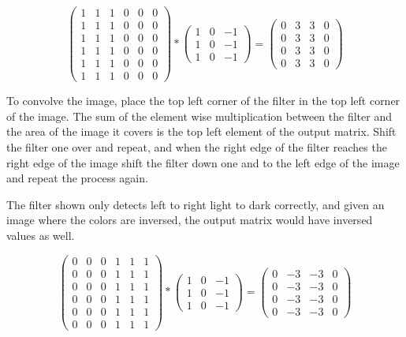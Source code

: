 \documentclass[12pt]{article}
\begin{document}
\[
    \begin{pmatrix}
        1 & 1 & 1 & 0 & 0 & 0\\
        1 & 1 & 1 & 0 & 0 & 0\\
        1 & 1 & 1 & 0 & 0 & 0\\
        1 & 1 & 1 & 0 & 0 & 0\\
        1 & 1 & 1 & 0 & 0 & 0\\
        1 & 1 & 1 & 0 & 0 & 0
    \end{pmatrix}
    *
    \begin{pmatrix}
        1 & 0 & -1\\
        1 & 0 & -1\\
        1 & 0 & -1
    \end{pmatrix}
    =
    \begin{pmatrix}
        0 & 3 & 3 & 0\\
        0 & 3 & 3 & 0\\
        0 & 3 & 3 & 0\\
        0 & 3 & 3 & 0
    \end{pmatrix}
\]

To convolve the image, place the top left corner of the filter in the top left corner of
the image. The sum of the element wise multiplication between the filter and the area of
the image it covers is the top left element of the output matrix. Shift the filter one over
and repeat, and when the right edge of the filter reaches the right edge of the image shift
the filter down one and to the left edge of the image and repeat the process again.

The filter shown only detects left to right light to dark correctly, and given an image where
the colors are inversed, the output matrix would have inversed values as well.

\[
    \begin{pmatrix}
        0 & 0 & 0 & 1 & 1 & 1\\
        0 & 0 & 0 & 1 & 1 & 1\\
        0 & 0 & 0 & 1 & 1 & 1\\
        0 & 0 & 0 & 1 & 1 & 1\\
        0 & 0 & 0 & 1 & 1 & 1\\
        0 & 0 & 0 & 1 & 1 & 1
    \end{pmatrix}
    *
    \begin{pmatrix}
        1 & 0 & -1\\
        1 & 0 & -1\\
        1 & 0 & -1
    \end{pmatrix}
    =
    \begin{pmatrix}
        0 & -3 & -3 & 0\\
        0 & -3 & -3 & 0\\
        0 & -3 & -3 & 0\\
        0 & -3 & -3 & 0
    \end{pmatrix}
\]
\end{document}
